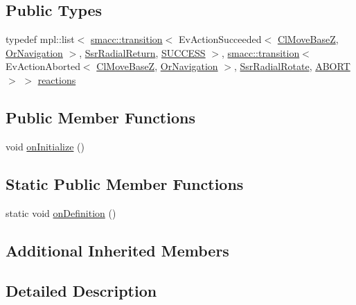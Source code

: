 \subsection*{Public Types}
\begin{DoxyCompactItemize}
\item 
typedef mpl\+::list$<$ \hyperlink{classsmacc_1_1transition}{smacc\+::transition}$<$ Ev\+Action\+Succeeded$<$ \hyperlink{classmove__base__z__client_1_1ClMoveBaseZ}{Cl\+Move\+BaseZ}, \hyperlink{classsm__dance__bot_1_1OrNavigation}{Or\+Navigation} $>$, \hyperlink{structsm__dance__bot_1_1radial__motion__states_1_1SsrRadialReturn}{Ssr\+Radial\+Return}, \hyperlink{classSUCCESS}{S\+U\+C\+C\+E\+SS} $>$, \hyperlink{classsmacc_1_1transition}{smacc\+::transition}$<$ Ev\+Action\+Aborted$<$ \hyperlink{classmove__base__z__client_1_1ClMoveBaseZ}{Cl\+Move\+BaseZ}, \hyperlink{classsm__dance__bot_1_1OrNavigation}{Or\+Navigation} $>$, \hyperlink{structsm__dance__bot_1_1radial__motion__states_1_1SsrRadialRotate}{Ssr\+Radial\+Rotate}, \hyperlink{classABORT}{A\+B\+O\+RT} $>$ $>$ \hyperlink{structsm__dance__bot_1_1radial__motion__states_1_1SsrRadialEndPoint_a121fb5fcb69ab82b71bf54456c2b4413}{reactions}
\end{DoxyCompactItemize}
\subsection*{Public Member Functions}
\begin{DoxyCompactItemize}
\item 
void \hyperlink{structsm__dance__bot_1_1radial__motion__states_1_1SsrRadialEndPoint_a3f2e2ff94817a17f430cbaf19dc72101}{on\+Initialize} ()
\end{DoxyCompactItemize}
\subsection*{Static Public Member Functions}
\begin{DoxyCompactItemize}
\item 
static void \hyperlink{structsm__dance__bot_1_1radial__motion__states_1_1SsrRadialEndPoint_a4f48507456f6d3385522c4c9c009d024}{on\+Definition} ()
\end{DoxyCompactItemize}
\subsection*{Additional Inherited Members}


\subsection{Detailed Description}


